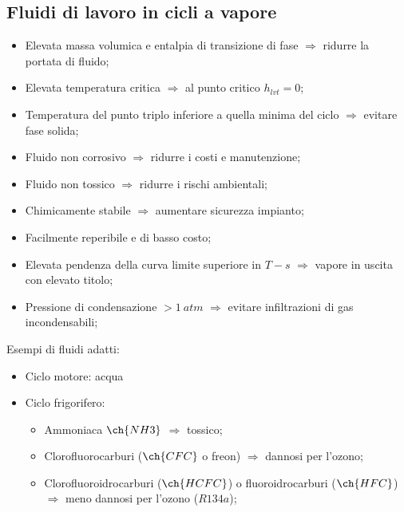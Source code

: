 \subsection{Fluidi di lavoro in cicli a vapore}

\begin{itemize}
    \item Elevata massa volumica e entalpia di transizione di fase $\Rightarrow$ ridurre la portata di fluido;
    \item Elevata temperatura critica $\Rightarrow$ al punto critico $h_{lvt} = 0$;
    \item Temperatura del punto triplo inferiore a quella minima del ciclo $\Rightarrow$ evitare fase solida;
    \item Fluido non corrosivo $\Rightarrow$ ridurre i costi e manutenzione;
    \item Fluido non tossico $\Rightarrow$ ridurre i rischi ambientali;
    \item Chimicamente stabile $\Rightarrow$ aumentare sicurezza impianto;
    \item Facilmente reperibile e di basso costo;
    \item Elevata pendenza della curva limite superiore in $T-s$ $\Rightarrow$ vapore in uscita con elevato titolo;
    \item Pressione di condensazione $> \SI{1}{atm}$ $\Rightarrow$ evitare infiltrazioni di gas incondensabili;
\end{itemize}

Esempi di fluidi adatti:

\begin{itemize}
    \item Ciclo motore: acqua
    \item Ciclo frigorifero:
    \begin{itemize}
        \item Ammoniaca $\ch{NH3}$ $\Rightarrow$ tossico;
        \item Clorofluorocarburi ($\ch{CFC}$ o freon) $\Rightarrow$ dannosi per l'ozono;
        \item Clorofluoroidrocarburi ($\ch{HCFC}$) o fluoroidrocarburi ($\ch{HFC}$) $\Rightarrow$ meno dannosi per l'ozono ($R134a$);
    \end{itemize}
\end{itemize}
